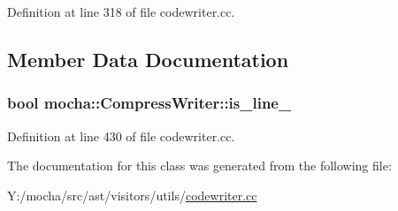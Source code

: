 Definition at line 318 of file codewriter.cc.



\subsection{Member Data Documentation}
\hypertarget{classmocha_1_1_compress_writer_a934a10b612f235440cfef0a4ccbcaa5a}{
\subsubsection[{is\_\-line\_\-}]{\setlength{\rightskip}{0pt plus 5cm}bool {\bf mocha::CompressWriter::is\_\-line\_\-}}}
\label{classmocha_1_1_compress_writer_a934a10b612f235440cfef0a4ccbcaa5a}


Definition at line 430 of file codewriter.cc.



The documentation for this class was generated from the following file:\begin{DoxyCompactItemize}
\item 
Y:/mocha/src/ast/visitors/utils/\hyperlink{codewriter_8cc}{codewriter.cc}\end{DoxyCompactItemize}
